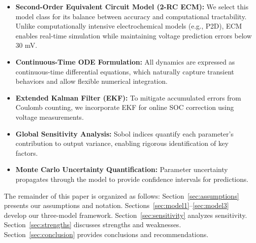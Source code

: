 \begin{itemize}
    \item \textbf{Second-Order Equivalent Circuit Model (2-RC ECM):} We select this model class for its balance between accuracy and computational tractability. Unlike computationally intensive electrochemical models (e.g., P2D), ECM enables real-time simulation while maintaining voltage prediction errors below 30 mV.
    
    \item \textbf{Continuous-Time ODE Formulation:} All dynamics are expressed as continuous-time differential equations, which naturally capture transient behaviors and allow flexible numerical integration.
    
    \item \textbf{Extended Kalman Filter (EKF):} To mitigate accumulated errors from Coulomb counting, we incorporate EKF for online SOC correction using voltage measurements.
    
    \item \textbf{Global Sensitivity Analysis:} Sobol indices quantify each parameter's contribution to output variance, enabling rigorous identification of key factors.
    
    \item \textbf{Monte Carlo Uncertainty Quantification:} Parameter uncertainty propagates through the model to provide confidence intervals for predictions.
\end{itemize}

The remainder of this paper is organized as follows: Section~\ref{sec:assumptions} presents our assumptions and notation. Sections~\ref{sec:model1}--\ref{sec:model3} develop our three-model framework. Section~\ref{sec:sensitivity} analyzes sensitivity. Section~\ref{sec:strengths} discusses strengths and weaknesses. Section~\ref{sec:conclusion} provides conclusions and recommendations.
